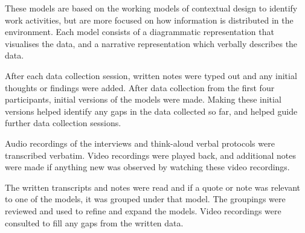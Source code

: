 These models are based on the working models of contextual design to identify work activities, but are more focused on how information is distributed in the environment. Each model consists of a diagrammatic representation that visualises the data, and a narrative representation which verbally describes the data.

After each data collection session, written notes were typed out and any initial thoughts or findings were added. After data collection from the first four participants, initial versions of the models were made. Making these initial versions helped identify any gaps in the data collected so far, and helped guide further data collection sessions.

Audio recordings of the interviews and think-aloud verbal protocols were transcribed verbatim. Video recordings were played back, and additional notes were made if anything new was observed by watching these video recordings.

The written transcripts and notes were read and if a quote or note was relevant to one of the models, it was grouped under that model. The groupings were reviewed and used to refine and expand the models. Video recordings were consulted to fill any gaps from the written data.


